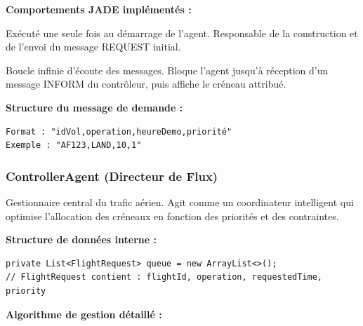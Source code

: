 \documentclass[12pt,a4paper]{article}
\begin{document}
\textbf{Comportements JADE implémentés :}

\begin{description}[style=nextline, leftmargin=0pt]
    \item[\texttt{OneShotBehaviour}] Exécuté une seule fois au démarrage de l'agent. Responsable de la construction et de l'envoi du message REQUEST initial.

    \item[\texttt{CyclicBehaviour}] Boucle infinie d'écoute des messages. Bloque l'agent jusqu'à réception d'un message INFORM du contrôleur, puis affiche le créneau attribué.
\end{description}

\textbf{Structure du message de demande :}
\begin{verbatim}
Format : "idVol,operation,heureDemo,priorité"
Exemple : "AF123,LAND,10,1"
\end{verbatim}

\subsubsection{ControllerAgent (Directeur de Flux)}

\begin{tcolorbox}[colback=lightblue!15, colframe=primaryblue, title=\textbf{Rôle et Responsabilités}]
Gestionnaire central du trafic aérien. Agit comme un coordinateur intelligent qui optimise l'allocation des créneaux en fonction des priorités et des contraintes.
\end{tcolorbox}

\textbf{Structure de données interne :}

\begin{lstlisting}[caption=Structure de la file d'attente]
private List<FlightRequest> queue = new ArrayList<>();
// FlightRequest contient : flightId, operation, requestedTime, priority
\end{lstlisting}

\textbf{Algorithme de gestion détaillé :}
\end{document}
